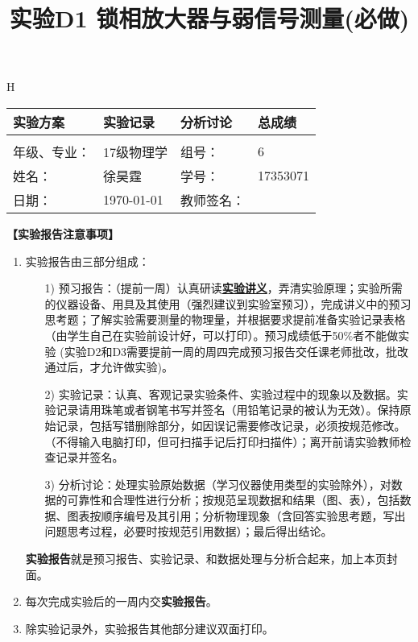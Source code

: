 \documentclass{ctexart}
\title{实验D1 锁相放大器与弱信号测量(必做)}
\begin{document}
\maketitle
\begin{table}{H}
  \centering
\begin{tabular}{|p{8em}|p{8em}|p{8em}|p{5em}|}
\hline
		\large{实验方案} &\large{实验记录}  &\large{分析讨论} &\large{总成绩}\\
		\hline
		        &          &          &  \\
	    \hline
	\hline 
	年级、专业： &17级物理学 &组号：& 6 \\
	\hline
	姓名：& 徐昊霆 &学号：&17353071  \\
	\hline
	日期：& \today &教师签名： &  \\
    \hline	
        \end{tabular}
\end{table}

        \large{\bf【实验报告注意事项】}
\begin{enumerate}
 \item 实验报告由三部分组成：
 \begin{enumerate}
  \item[1)]预习报告：（提前一周）认真研读\textbf{\uline{实验讲义}}，弄清实验原理；实验所需的仪器设备、用具及其使用（强烈建议到实验室预习），完成讲义中的预习思考题；了解实验需要测量的物理量，并根据要求提前准备实验记录表格（由学生自己在实验前设计好，可以打印）。预习成绩低于50\%者不能做实验{\color{red} (实验D2和D3需要提前一周的周四完成预习报告交任课老师批改，批改通过后，才允许做实验)}。

  \item[2)]实验记录：认真、客观记录实验条件、实验过程中的现象以及数据。实验记录请用珠笔或者钢笔书写并签名（{\color{red}用铅笔记录的被认为无效}）。{\color{red}保持原始记录，包括写错删除部分，如因误记需要修改记录，必须按规范修改。}（不得输入电脑打印，但可扫描手记后打印扫描件）；离开前请实验教师检查记录并签名。
  \item[3)]分析讨论：处理实验原始数据（学习仪器使用类型的实验除外），对数据的可靠性和合理性进行分析；按规范呈现数据和结果（图、表），包括数据、图表按顺序编号及其引用；分析物理现象（含回答实验思考题，写出问题思考过程，必要时按规范引用数据）；最后得出结论。
 \end{enumerate}
 \textbf{实验报告}就是预习报告、实验记录、和数据处理与分析合起来，加上本页封面。
 \item 每次完成实验后的一周内交\textbf{实验报告}。
 \item 除实验记录外，实验报告其他部分建议双面打印。
\end{enumerate}
\newpage
\tableofcontents
\newpage
\end{document}
